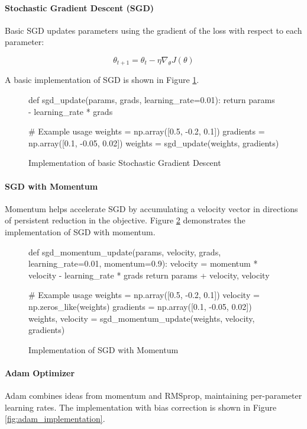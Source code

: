 \paragraph{Stochastic Gradient Descent (SGD)}
Basic SGD updates parameters using the gradient of the loss with respect to each parameter:

\[ \theta_{t+1} = \theta_t - \eta \nabla_\theta J(\theta) \]

A basic implementation of SGD is shown in Figure \ref{fig:sgd_implementation}.

\begin{figure}[h]
\begin{pythoncode}
def sgd_update(params, grads, learning_rate=0.01):
    return params - learning_rate * grads

# Example usage
weights = np.array([0.5, -0.2, 0.1])
gradients = np.array([0.1, -0.05, 0.02])
weights = sgd_update(weights, gradients)
\end{pythoncode}
\caption{Implementation of basic Stochastic Gradient Descent}
\label{fig:sgd_implementation}
\end{figure}

\paragraph{SGD with Momentum}
Momentum helps accelerate SGD by accumulating a velocity vector in directions of persistent reduction in the objective. Figure \ref{fig:momentum_implementation} demonstrates the implementation of SGD with momentum.

\begin{figure}[h]
\begin{pythoncode}
def sgd_momentum_update(params, velocity, grads, 
                       learning_rate=0.01, momentum=0.9):
    velocity = momentum * velocity - learning_rate * grads
    return params + velocity, velocity

# Example usage
weights = np.array([0.5, -0.2, 0.1])
velocity = np.zeros_like(weights)
gradients = np.array([0.1, -0.05, 0.02])
weights, velocity = sgd_momentum_update(weights, velocity, gradients)
\end{pythoncode}
\caption{Implementation of SGD with Momentum}
\label{fig:momentum_implementation}
\end{figure}

\paragraph{Adam Optimizer}
Adam combines ideas from momentum and RMSprop, maintaining per-parameter learning rates. The implementation with bias correction is shown in Figure \ref{fig:adam_implementation}.

